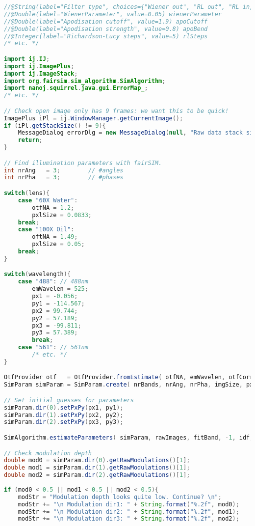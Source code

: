\clearpage
\begin{lstlisting}[language=java,caption={Extracts from the Beanshell script used for the LAG SIM parameter tester},label={snip:lagsim-fiji},frame=single]
//@String(label="Filter type", choices={"Wiener out", "RL out", "RL in, Wiener out", "RL in, RL out"}) filter
//@Double(label="WienerParameter", value=0.05) wienerParameter
//@Double(label="Apodisation cutoff", value=1.9) apoCutoff
//@Double(label="Apodisation strength", value=0.8) apoBend
//@Integer(label="Richardson-Lucy steps", value=5) rlSteps
/* etc. */

import ij.IJ;
import ij.ImagePlus;
import ij.ImageStack;
import org.fairsim.sim_algorithm.SimAlgorithm;
import nanoj.squirrel.java.gui.ErrorMap_;
/* etc. */

// Check open image only has 9 frames: we want this to be quick! 
ImagePlus iPl = ij.WindowManager.getCurrentImage();
if (iPl.getStackSize() != 9){
	MessageDialog errorDlg = new MessageDialog(null, "Raw data stack size error!", "Please use a single-slice, single-channel image for parameter finding.");
	return;
}

// Find illumination parameters with fairSIM. 
int nrAng   = 3;		// #angles
int nrPha   = 3;		// #phases

switch(lens){
	case "60X Water":
		otfNA = 1.2;
		pxlSize = 0.0833;
	break;
	case "100X Oil":
		oftNA = 1.49;
		pxlSize = 0.05;
	break;
}

switch(wavelength){
	case "488": // 488nm
		emWavelen = 525; 
		px1 = -0.056;
		py1 = -114.567;
		px2 = 99.744;
		py2 = 57.189;
		px3 = -99.811;
		py3 = 57.389;
		break;
	case "561": // 561nm
		/* etc. */
}

OtfProvider otf   = OtfProvider.fromEstimate( otfNA, emWavelen, otfCorr );
SimParam simParam = SimParam.create( nrBands, nrAng, nrPha, imgSize, pxlSize, otf );

// Set initial guesses for parameters
simParam.dir(0).setPxPy(px1, py1);
simParam.dir(1).setPxPy(px2, py2);
simParam.dir(2).setPxPy(px3, py3);

SimAlgorithm.estimateParameters( simParam, rawImages, fitBand, -1, idf, visualFeedback, null);

// Check modulation depth 
double mod0 = simParam.dir(0).getRawModulations()[1];
double mod1 = simParam.dir(1).getRawModulations()[1];
double mod2 = simParam.dir(2).getRawModulations()[1];
					
if (mod0 < 0.5 || mod1 < 0.5 || mod2 < 0.5){
	modStr = "Modulation depth looks quite low. Continue? \n";
	modStr += "\n Modulation dir1: " + String.format("%.2f", mod0);
	modStr += "\n Modulation dir2: " + String.format("%.2f", mod1);
	modStr += "\n Modulation dir3: " + String.format("%.2f", mod2);
						

\end{lstlisting}
